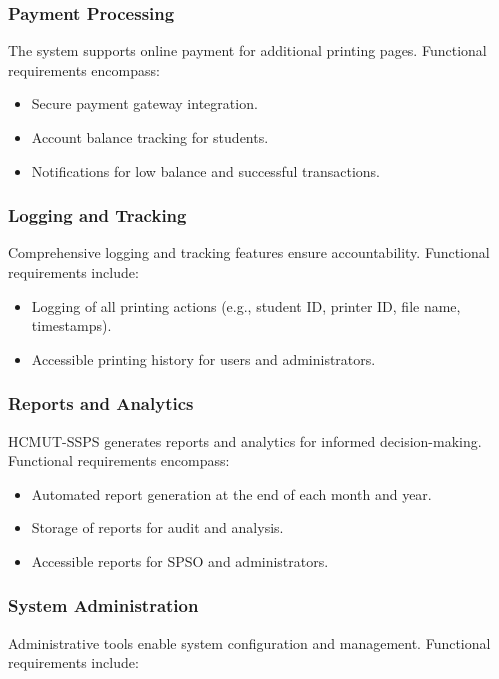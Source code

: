 \documentclass{article}
\begin{document}
\subsubsection{Payment Processing}
The system supports online payment for additional printing pages. Functional requirements encompass:

\begin{itemize}
    \item Secure payment gateway integration.
    \item Account balance tracking for students.
    \item Notifications for low balance and successful transactions.
\end{itemize}

\subsubsection{Logging and Tracking}
Comprehensive logging and tracking features ensure accountability. Functional requirements include:

\begin{itemize}
    \item Logging of all printing actions (e.g., student ID, printer ID, file name, timestamps).
    \item Accessible printing history for users and administrators.
\end{itemize}

\subsubsection{Reports and Analytics}
HCMUT-SSPS generates reports and analytics for informed decision-making. Functional requirements encompass:

\begin{itemize}
    \item Automated report generation at the end of each month and year.
    \item Storage of reports for audit and analysis.
    \item Accessible reports for SPSO and administrators.
\end{itemize}

\subsubsection{System Administration}
Administrative tools enable system configuration and management. Functional requirements include:
\end{document}
